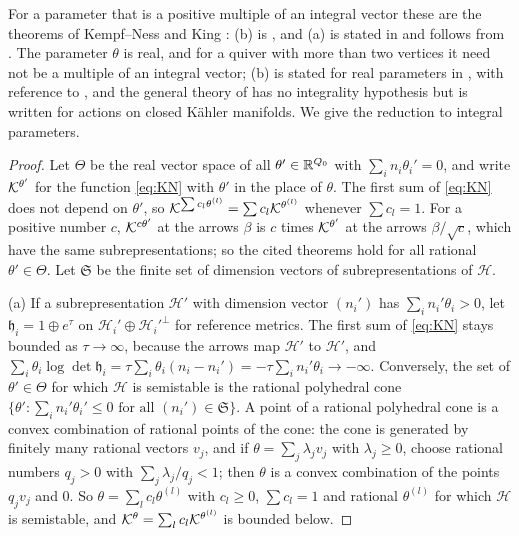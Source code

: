 For a parameter that is a positive multiple of an integral vector these are
the theorems of Kempf--Ness and King \cite{kn79,kin94}: (b) is
\cite[Proposition~6.5]{kin94}, and (a) is stated in
\cite[Theorem~5.1]{hkkp23} and follows from
\cite[Proposition~3.1, Lemmas~2.2 and~6.3]{kin94}. The parameter $\theta$ is
real, and for a quiver with more than two vertices it need not be a multiple
of an integral vector; (b) is stated for real parameters in
\cite[Theorem~5.1]{hkkp26}, with reference to \cite{kin94}, and the general
theory of \cite{grs21} has no integrality hypothesis but is written for
actions on closed K\"ahler manifolds. We give the reduction to integral
parameters.

\begin{proof}
Let $\Theta$ be the real vector space of all $\theta'\in\mathbb R^{Q_0}$ with
$\sum_in_i\theta_i'=0$, and write $\mathcal K^{\theta'}$ for the function
\eqref{eq:KN} with $\theta'$ in the place of $\theta$. The first sum of
\eqref{eq:KN} does not depend on $\theta'$, so
$\mathcal K^{\sum c_l\theta^{(l)}}=\sum c_l\mathcal K^{\theta^{(l)}}$ whenever $\sum c_l=1$. For
a positive number $c$, $\mathcal K^{c\theta'}$ at the arrows $\beta$ is $c$ times
$\mathcal K^{\theta'}$ at the arrows $\beta/\sqrt c$, which have the same
subrepresentations; so the cited theorems hold for all rational
$\theta'\in\Theta$. Let $\mathfrak S$ be the finite set of dimension vectors of
subrepresentations of $\mathcal H$.

(a) If a subrepresentation $\mathcal H'$ with dimension vector $(n_i')$ has
$\sum_in_i'\theta_i>0$, let $\mathfrak h_i=1\oplus e^\tau$ on
$\mathcal H_i'\oplus\mathcal H_i'^\perp$ for reference metrics. The first sum
of \eqref{eq:KN} stays bounded as $\tau\to\infty$, because the arrows map
$\mathcal H'$ to $\mathcal H'$, and
$\sum_i\theta_i\log\det\mathfrak h_i=\tau\sum_i\theta_i(n_i-n_i')=-\tau\sum_in_i'\theta_i\to-\infty$.
Conversely, the set of $\theta'\in\Theta$ for which $\mathcal H$ is
semistable is the rational polyhedral cone
$\{\theta':\sum_in_i'\theta_i'\leq0\text{ for all }(n_i')\in\mathfrak S\}$. A point
of a rational polyhedral cone is a convex combination of rational points of
the cone: the cone is generated by finitely many rational vectors $v_j$, and
if $\theta=\sum_j\lambda_jv_j$ with $\lambda_j\geq0$, choose rational numbers
$q_j>0$ with $\sum_j\lambda_j/q_j<1$; then $\theta$ is a convex combination of
the points $q_jv_j$ and $0$. So $\theta=\sum_lc_l\theta^{(l)}$ with $c_l\geq0$, $\sum c_l=1$ and
rational $\theta^{(l)}$ for which $\mathcal H$ is semistable, and
$\mathcal K^\theta=\sum_lc_l\mathcal K^{\theta^{(l)}}$ is bounded below.


\end{proof}
